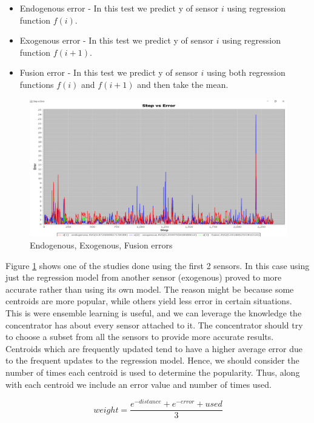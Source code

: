 \documentclass{mproj}
\begin{document}
\begin{itemize}  
\item Endogenous error - In this test we predict y of sensor $i$ using regression function $f(i)$.
\item Exogenous error - In this test we predict y of sensor $i$ using regression function $f(i+1)$.
\item Fusion error - In this test we predict y of sensor $i$ using both regression functions $f(i)$ and $f(i+1)$ and then take the mean.
\end{itemize}

\begin{figure}[H]
\caption{Endogenous, Exogenous, Fusion errors}
\label{fig:functionsErrors}
\centerline{\includegraphics[scale=0.4]{e1e2e3}}
\end{figure}

Figure \ref{fig:functionsErrors} shows one of the studies done using the first 2 sensors. In this case using just the regression model from another sensor (exogenous) proved to more accurate rather than using its own model. The reason might be because some centroids are more popular, while others yield less error in certain situations. This is were ensemble learning is useful, and we can leverage the knowledge the concentrator has about every sensor attached to it. The concentrator should try to choose a subset from all the sensors to provide more accurate results. Centroids which are frequently updated tend to have a higher average error due to the frequent updates to the regression model. Hence, we should consider the number of times each centroid is used to determine the popularity. Thus, along with each centroid we include an error value and number of times used.

\begin{equation}
\label{eq:ourEquation}
weight=\frac{e^{-distance} + e^{-error} + used}{3}
\end{equation}
\end{document}
